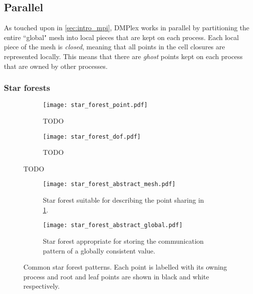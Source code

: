 \documentclass[thesis]{subfiles}
\begin{document}
\subsection{Parallel}
\label{sec:dmplex_parallel}

As touched upon in \cref{sec:intro_mpi}, DMPlex works in parallel by partitioning the entire ``global" mesh into local pieces that are kept on each process.
Each local piece of the mesh is \textit{closed}, meaning that all points in the cell closures are represented locally.
This means that there are \textit{ghost} points kept on each process that are owned by other processes.

\subsubsection{Star forests}

\begin{figure}
  \centering
  \begin{subfigure}{\textwidth}
    \centering
    \texttt{[image: star\_forest\_point.pdf]}
    \caption{TODO}
    \label{fig:star_forest_point}
  \end{subfigure}
  \begin{subfigure}{\textwidth}
    \centering
    \texttt{[image: star\_forest\_dof.pdf]}
    \caption{TODO}
    \label{fig:star_forest_dof}
  \end{subfigure}
  \caption{TODO}
  \label{fig:star_forest}
\end{figure}

\begin{figure}
  \centering
  \begin{subfigure}{.6\textwidth}
    \centering
    \texttt{[image: star\_forest\_abstract\_mesh.pdf]}
    \caption{Star forest suitable for describing the point sharing in \cref{fig:star_forest_point}.}
  \end{subfigure}
  \begin{subfigure}{.39\textwidth}
    \centering
    \texttt{[image: star\_forest\_abstract\_global.pdf]}
    \caption{Star forest appropriate for storing the communication pattern of a globally consistent value.}
  \end{subfigure}
  \caption{
    Common star forest patterns.
    Each point is labelled with its owning process and root and leaf points are shown in black and white respectively.
  }
  \label{fig:star_forest_abstract}
\end{figure}

\end{document}
